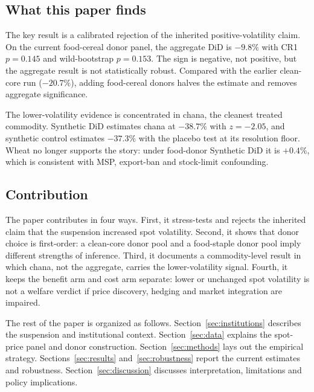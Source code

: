 \subsection{What this paper finds}

The key result is a calibrated rejection of the inherited positive-volatility claim.
On the current food-cereal donor panel, the aggregate DiD is $-9.8\%$ with CR1
$p=0.145$ and wild-bootstrap $p=0.153$. The sign is negative, not positive, but the
aggregate result is not statistically robust. Compared with the earlier clean-core
run ($-20.7\%$), adding food-cereal donors halves the estimate and removes aggregate
significance.

The lower-volatility evidence is concentrated in chana, the cleanest treated
commodity. Synthetic DiD estimates chana at $-38.7\%$ with $z=-2.05$, and synthetic
control estimates $-37.3\%$ with the placebo test at its resolution floor. Wheat no
longer supports the story: under food-donor Synthetic DiD it is $+0.4\%$, which is
consistent with MSP, export-ban and stock-limit confounding.

\subsection{Contribution}

The paper contributes in four ways. First, it stress-tests and rejects the inherited
claim that the suspension increased spot volatility. Second, it shows that donor choice
is first-order: a clean-core donor pool and a food-staple donor pool imply different
strengths of inference. Third, it documents a commodity-level result in which chana,
not the aggregate, carries the lower-volatility signal. Fourth, it keeps the benefit
arm and cost arm separate: lower or unchanged spot volatility is not a welfare verdict
if price discovery, hedging and market integration are impaired.

The rest of the paper is organized as follows. Section~\ref{sec:institutions} describes
the suspension and institutional context. Section~\ref{sec:data} explains the spot-price
panel and donor construction. Section~\ref{sec:methods} lays out the empirical strategy.
Sections~\ref{sec:results} and~\ref{sec:robustness} report the current estimates and
robustness. Section~\ref{sec:discussion} discusses interpretation, limitations and policy
implications.
